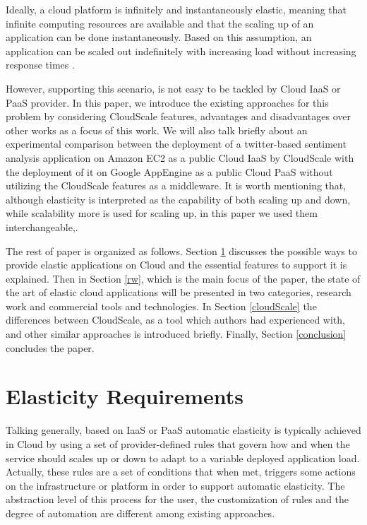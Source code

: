 \documentclass{sig-alternate}
\begin{document}
Ideally, a cloud platform is infinitely and instantaneously elastic, meaning that infinite computing resources are available and that the scaling up of an application can be done instantaneously. Based on this assumption, an application can be scaled out indefinitely with increasing load without increasing response times \cite{brebner2012your}. 

However, supporting this scenario, is not easy to be tackled by Cloud IaaS or PaaS provider. In this paper, we introduce the existing approaches for this problem by considering CloudScale \cite{leitner2012cloudscale} features, advantages and disadvantages over other works as a focus of this work. We will also talk briefly about an experimental comparison between the deployment of a twitter-based sentiment analysis application on Amazon EC2 as a public Cloud IaaS by CloudScale with the deployment of it on Google AppEngine as a public Cloud PaaS without utilizing the CloudScale features as a middleware. It is worth mentioning that, although elasticity is interpreted as the capability of both scaling up and down, while scalability more is used for scaling up, in this paper we used them interchangeable,.

The rest of paper is organized as follows. Section \ref{elasticity-req} discusses the possible ways to provide elastic applications on Cloud and the essential features to support it is explained. Then in Section \ref{rw}, which is the main focus of the paper, the state of the art of elastic cloud applications will be presented in two categories, research work and commercial tools and technologies. In Section \ref{cloudScale} the differences between CloudScale, as a tool which authors had experienced with, and other similar approaches is introduced briefly. Finally, Section \ref{conclusion} concludes the paper.

\section{Elasticity Requirements} \label{elasticity-req}

Talking generally, based on \cite{vaquero2011dynamically} IaaS or PaaS automatic elasticity is typically achieved in Cloud by using a set of provider-defined rules that govern how and when the service should scales up or down to adapt to a variable deployed application load. Actually, these rules are a set of conditions that when met, triggers some actions on the infrastructure or platform in order to support automatic elasticity. The abstraction level of this process for the user, the customization of rules and the degree of automation are different among existing approaches.
\end{document}
